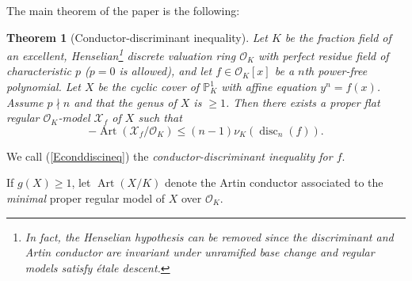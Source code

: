\documentclass[12pt]{amsart}
\numberwithin{equation}{section}
\newtheorem{theorem}[equation]{Theorem}
\theoremstyle{definition}
\newtheorem{remark}[equation]{Remark}
\newcommand{\padma}[1]{{\color{Magenta} \sf $\clubsuit\clubsuit\clubsuit$ Padma: [#1]}}
\newcommand{\andrew}[1]{{\color{Green} \sf $\diamondsuit\diamondsuit\diamondsuit$ Andrew: [#1]}}
\newcommand{\mc}[1]{\mathcal{#1}}
\newcommand{\proj}{\mathbb P}
\DeclareMathOperator{\disc}{disc}
\DeclareMathOperator{\Art}{Art}
\DeclareMathOperator{\rad}{rad}
\begin{document}






The main theorem of the paper is the following:
\begin{theorem}[Conductor-discriminant inequality]\label{Tcdi}
Let $K$ be the fraction field of an excellent, Henselian\footnote{In fact, the Henselian hypothesis can be removed since the discriminant and Artin conductor are invariant under unramified base change and regular models satisfy \'{e}tale descent.} discrete
valuation ring $\mc{O}_K$
with perfect residue field of characteristic $p$ ($p=0$
is allowed), and let
$f \in \mc{O}_K[x]$ be a $n$th power-free polynomial.
Let $X$ be the cyclic cover of $\proj^1_K$  with affine 
equation $y^n=f(x)$.  Assume $p \nmid n$ and that the genus of $X$ is $\geq 1$. Then there exists a proper flat regular $\mc{O}_K$-model $\mc{X}_f$ of $X$ such that 
\begin{equation}\label{Econddiscineq} -\Art(\mc{X}_f/\mc{O}_K) \leq (n-1)\nu_K(\disc_n(f)). \end{equation}
\end{theorem}
We call (\ref{Econddiscineq}) the \textit{conductor-discriminant inequality for $f$}. 

  If $g(X) \geq 1$, let $\Art (X/K)$ denote the Artin conductor associated to the
\emph{minimal} proper regular model of $X$ over $\mc{O}_K$.  
\end{document}
